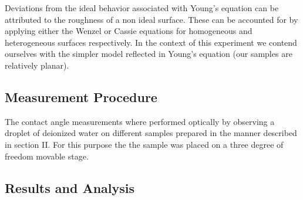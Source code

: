 Deviations from the ideal behavior associated with Young's equation can be attributed to the roughness of a non ideal surface. These can be accounted for by applying either the Wenzel or Cassie equations for homogeneous and heterogeneous surfaces respectively. In the context of this experiment we contend ourselves with the simpler model reflected in Young's equation (our samples are relatively planar).

\subsection{Measurement Procedure}

The contact angle measurements where performed optically by observing a droplet of deionized water on different samples prepared in the manner described in section II. For this purpose the the sample was placed on a three degree of freedom movable stage. 

\subsection{Results and Analysis}